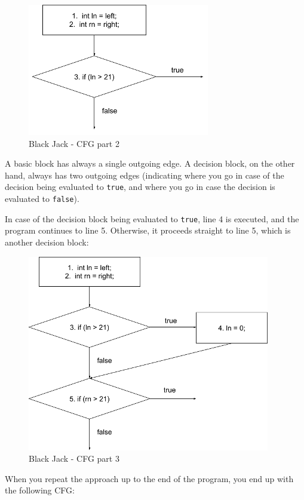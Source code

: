 \begin{figure}
\centering
\includegraphics{img/structural-testing/examples/bj-p2.png}
\caption{Black Jack - CFG part 2}
\end{figure}

A basic block has always a single outgoing edge. A decision block, on
the other hand, always has two outgoing edges (indicating where you go
in case of the decision being evaluated to \texttt{true}, and where you
go in case the decision is evaluated to \texttt{false}).

In case of the decision block being evaluated to \texttt{true}, line 4
is executed, and the program continues to line 5. Otherwise, it proceeds
straight to line 5, which is another decision block:

\begin{figure}
\centering
\includegraphics{img/structural-testing/examples/bj-p3.png}
\caption{Black Jack - CFG part 3}
\end{figure}

When you repeat the approach up to the end of the program, you end up
with the following CFG:

